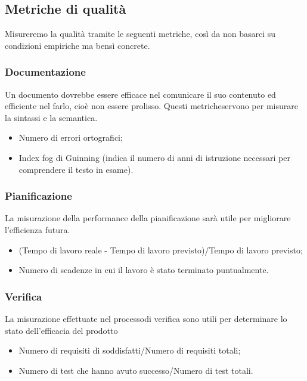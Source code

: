 \subsection{Metriche di qualità}
Misureremo la qualità tramite le seguenti metriche\glo, così da non basarci su condizioni empiriche ma bensì concrete.

\subsubsection{Documentazione}
Un documento dovrebbe essere efficace nel comunicare il suo contenuto ed efficiente nel farlo, cioè non essere prolisso.
Questi metriche\glosp servono per misurare la sintassi e la semantica.
\begin{itemize}
	\item Numero di errori ortografici;
	\item Index fog di Guinning (indica il numero di anni di istruzione necessari per comprendere il testo in esame).
\end{itemize} 

\subsubsection{Pianificazione}
La misurazione della performance della pianificazione sarà utile per migliorare l'efficienza futura.
\begin{itemize}
	\item (Tempo di lavoro reale - Tempo di lavoro previsto)/Tempo di lavoro previsto;
	\item Numero di scadenze in cui il lavoro è stato terminato puntualmente.
\end{itemize}

\subsubsection{Verifica}
La misurazione effettuate nel processo\glosp di verifica sono utili per determinare lo stato dell'efficacia del prodotto\glosp
\begin{itemize}
	\item Numero di requisiti di soddisfatti/Numero di requisiti totali;
	\item Numero di test che hanno avuto successo/Numero di test totali.
\end{itemize}
